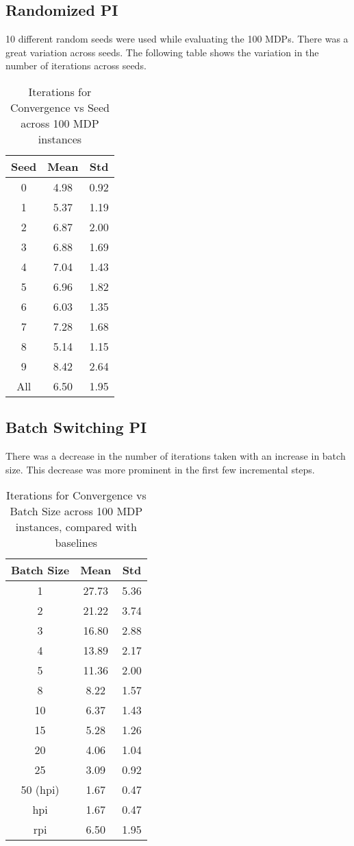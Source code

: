 \documentclass[11pt]{article}
\begin{document}
\subsection{Randomized PI}
10 different random seeds were used while evaluating the 100 MDPs. There was a great variation across seeds. The following table shows the variation in the number of iterations across seeds.
\begin{table}[h]
\begin{center}
\begin{tabular}{ |c|c|c| } 
 \hline
 Seed & Mean & Std \\ 
 \hline
0 & 4.98 & 0.92 \\
1 & 5.37 & 1.19 \\
2 & 6.87 & 2.00 \\
3 & 6.88 & 1.69 \\
4 & 7.04 & 1.43 \\
5 & 6.96 & 1.82 \\
6 & 6.03 & 1.35 \\
7 & 7.28 & 1.68 \\
8 & 5.14 & 1.15 \\
9 & 8.42 & 2.64 \\
\hline
All & 6.50 & 1.95 \\
\hline 
\end{tabular}
\end{center}
\caption{Iterations for Convergence vs Seed across 100 MDP instances}
\end{table}
\subsection{Batch Switching PI}
There was a decrease in the number of iterations taken with an increase in batch size. This decrease was more prominent in the first few incremental steps.
\begin{table}[h]
\begin{center}
\begin{tabular}{ |c|c|c| } 
 \hline
 Batch Size & Mean & Std \\ 
 \hline
1 & 27.73 & 5.36 \\
2 & 21.22 & 3.74 \\
3 & 16.80 & 2.88 \\
4 & 13.89 & 2.17 \\
5 & 11.36 & 2.00 \\
8 & 8.22 & 1.57 \\
10 & 6.37 & 1.43 \\
15 & 5.28 & 1.26 \\
20 & 4.06 & 1.04 \\
25 & 3.09 & 0.92 \\
50 (hpi) & 1.67 & 0.47 \\
\hline
hpi & 1.67 & 0.47 \\
\hline
rpi & 6.50 & 1.95 \\
\hline
\end{tabular}
\end{center}
\caption{Iterations for Convergence vs Batch Size across 100 MDP instances, compared with baselines}
\end{table}
\end{document}
